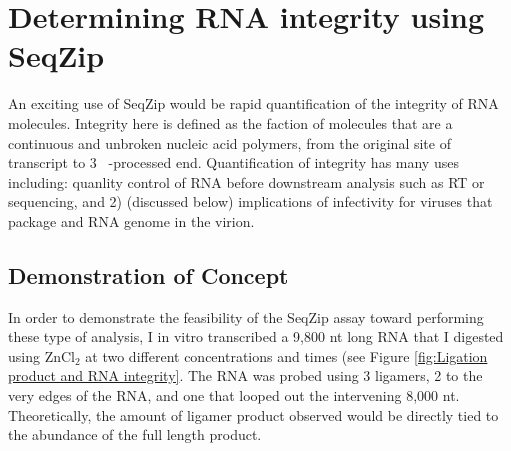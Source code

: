 \section{Determining RNA integrity using SeqZip}\label{sec: SeqZip Integrity}

  An exciting use of SeqZip would be rapid quantification of the integrity of RNA molecules. Integrity here is defined as the faction of molecules that are a continuous and unbroken nucleic acid polymers, from the original site of transcript to 3\textprime~ -processed end. Quantification of integrity has many uses including: quanlity control of RNA before downstream analysis such as RT or sequencing, and 2) (discussed below) implications of infectivity for viruses that package and RNA genome in the virion.


  \subsection{Demonstration of Concept}

  In order to demonstrate the feasibility of the SeqZip assay toward performing these type of analysis, I in vitro transcribed a 9,800 nt long RNA that I digested using ZnCl$_{2}$ at two different concentrations and times (see Figure \ref{fig:Ligation product and RNA integrity}. The RNA was probed using 3 ligamers, 2 to the very edges of the RNA, and one that looped out the intervening 8,000 nt. Theoretically, the amount of ligamer product observed would be directly tied to the abundance of the full length product.

